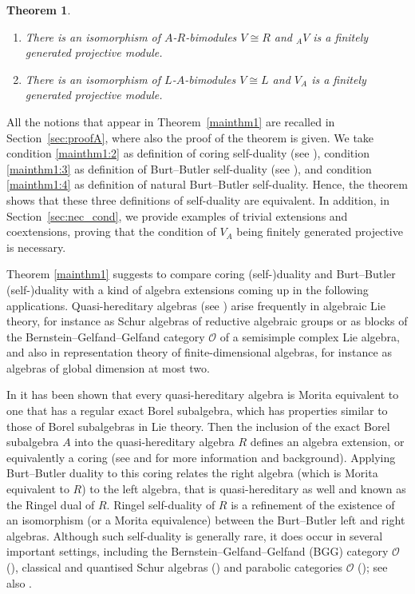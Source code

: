 \documentclass[12pt,a4paper]{amsart}
\theoremstyle{plain}
\newtheorem{thm}{Theorem}[section]
\theoremstyle{definition}
\numberwithin{equation}{thm}
\begin{document}
{\begin{thm}
\begin{enumerate}
\item\label{mainthm1:10} There is an isomorphism of $A$-$R$-bimodules $V \cong R$ and
  ${}_A V$ is a finitely generated projective module.

\item\label{mainthm1:11} There is an isomorphism of $L$-$A$-bimodules $V \cong L$ and
  $V_A$ is a finitely generated projective module.
\end{enumerate}  
\end{thm}

All the notions that appear in Theorem~\ref{mainthm1} are recalled in Section~\ref{sec:proofA}, where also the proof of the theorem is given.
We take condition \eqref{mainthm1:2} as definition of coring self-duality (see \cite{BW03}),
condition \eqref{mainthm1:3} as definition of Burt--Butler self-duality (see \cite{BB91}),
and condition \eqref{mainthm1:4} as definition
of natural Burt--Butler self-duality. Hence, the theorem shows that these
three definitions of self-duality are equivalent.  In addition, in Section~\ref{sec:nec_cond}, we provide examples of trivial extensions and coextensions, proving that the condition of $V_A$ being finitely generated projective is necessary.

Theorem \ref{mainthm1}
suggests to compare coring (self-)duality and
Burt--Butler (self-)duality with a kind of algebra extensions coming up
in the following applications. Quasi-hereditary algebras (see \cite{Sco87, CPS88, DR92})
arise frequently
in algebraic Lie theory, for instance as Schur algebras of reductive
algebraic groups or as blocks of
the Bernstein--Gelfand--Gelfand category $\mathcal O$ of a semisimple complex
Lie algebra, and also in representation theory of finite-dimensional
algebras, for instance as algebras of global dimension at most two.

In \cite{KKO14} it has been shown that every quasi-hereditary algebra is Morita
equivalent to one that has a regular
exact Borel subalgebra, which has properties
similar to those of Borel subalgebras in Lie theory. Then the
inclusion of the exact Borel subalgebra $A$ into the quasi-hereditary
algebra $R$ defines an algebra extension, or equivalently a coring (see
\cite{KKO14} and \cite{BKK20} for more information and background).
Applying Burt--Butler duality to this coring relates the right
algebra (which is Morita equivalent to $R$) to the left algebra,
that is quasi-hereditary as well and
known as the Ringel dual of $R$. Ringel self-duality of $R$
is a refinement of the existence of an isomorphism (or a Morita
equivalence) between the Burt--Butler left and right algebras.
Although such self-duality is generally rare, it does occur in several important settings, including the Bernstein--Gelfand--Gelfand (BGG) category $\mathcal{O}$ (\cite{Soe90}), classical and quantised Schur algebras (\cite{Don93,Don92}) and parabolic categories 
$\mathcal{O}$ (\cite{CM17}); see also \cite{EH02,CE18}.



}
\end{document}
